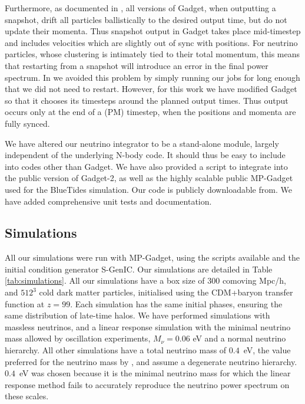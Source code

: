 \documentclass[useAMS, usenatbib]{mnras}
\begin{document}
Furthermore, as documented in \cite{Springel_2005}, all versions of Gadget, when outputting a snapshot, drift all particles ballistically to the desired output time, but do not update their momenta. Thus snapshot output in Gadget takes place mid-timestep and includes velocities which are slightly out of sync with positions. For neutrino particles, whose clustering is intimately tied to their total momentum, this means that restarting from a snapshot will introduce an error in the final power spectrum. In \cite{AHB} we avoided this problem by simply running our jobs for long enough that we did not need to restart. However, for this work we have modified Gadget so that it chooses its timesteps around the planned output times. Thus output occurs only at the end of a (PM) timestep, when the positions and momenta are fully synced.

We have altered our neutrino integrator to be a stand-alone module, largely
independent of the underlying N-body code. It should thus be easy to include
into codes other than Gadget. We have also provided a script to integrate into the
public version of Gadget-2, as well as the highly scalable public MP-Gadget
used for the BlueTides simulation. Our code is publicly downloadable from.
We have added comprehensive unit tests and documentation.

\subsection{Simulations}
\label{sec:simulations}

All our simulations were run with MP-Gadget, using the scripts available
and the initial condition generator S-GenIC. Our simulations are detailed in Table \ref{tab:simulations}.
All our simulations have a box size of $300$ comoving Mpc/h, and $512^3$ cold dark matter particles,
initialised using the CDM+baryon transfer function at $z=99$. Each simulation has the same initial phases,
ensuring the same distribution of late-time halos. We have performed simulations with massless neutrinos, and a linear response simulation with the minimal neutrino mass allowed by oscillation experiments, $M_\nu = 0.06$ eV and a normal neutrino hierarchy. All other simulations have a total neutrino mass of $0.4$~eV, the value preferred for the neutrino mass by \cite{Beutler_2014}, and assume a degenerate neutrino hierarchy. $0.4$~eV was chosen because it is the minimal neutrino mass for which the linear response method fails to accurately reproduce the neutrino power spectrum on these scales.
\end{document}
